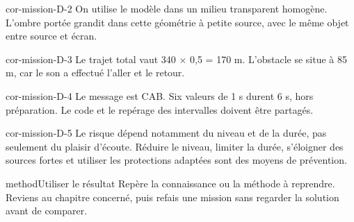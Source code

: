\documentclass[12pt,twoside,openany]{book}
\begin{document}
\begin{blocLivre}{cor-mission-D-2}
On utilise le modèle dans un milieu transparent homogène. L’ombre portée grandit dans cette géométrie à petite source, avec le même objet entre source et écran.\par
{}
\end{blocLivre}
\begin{blocLivre}{cor-mission-D-3}
Le trajet total vaut 340 \(\times\) 0,5 = 170 m. L’obstacle se situe à 85 m, car le son a effectué l’aller et le retour.\par
{}
\end{blocLivre}
\begin{blocLivre}{cor-mission-D-4}
Le message est CAB. Six valeurs de 1 s durent 6 s, hors préparation. Le code et le repérage des intervalles doivent être partagés.\par
\end{blocLivre}
\begin{blocLivre}{cor-mission-D-5}
Le risque dépend notamment du niveau et de la durée, pas seulement du plaisir d’écoute. Réduire le niveau, limiter la durée, s’éloigner des sources fortes et utiliser les protections adaptées sont des moyens de prévention.\par
\begin{pcEncadre}{method}{Utiliser le résultat}
Repère la connaissance ou la méthode à reprendre. Reviens au chapitre concerné, puis refais une mission sans regarder la solution avant de comparer.\par
\end{pcEncadre}
\end{blocLivre}
\clearpage\gdef\otChapNum{0}\gdef\otAccent{otNavy}\pagestyle{otFront}\label{annexes-debut}
\label{methode-mesure}
\end{document}
